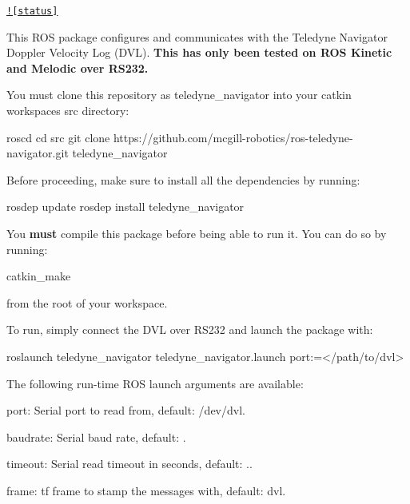 \href{https://dev.mcgillrobotics.com/job/ros-teledyne-navigator/job/master}{\tt !\mbox{[}status\mbox{]}}

This R\+OS package configures and communicates with the Teledyne Navigator Doppler Velocity Log (D\+VL). {\bfseries This has only been tested on R\+OS Kinetic and Melodic over R\+S232.}

You must clone this repository as {\ttfamily teledyne\+\_\+navigator} into your {\ttfamily catkin} workspace\textquotesingle{}s {\ttfamily src} directory\+:


\begin{DoxyCode}
roscd
cd src
git clone https://github.com/mcgill-robotics/ros-teledyne-navigator.git teledyne\_navigator
\end{DoxyCode}


Before proceeding, make sure to install all the dependencies by running\+:


\begin{DoxyCode}
rosdep update
rosdep install teledyne\_navigator
\end{DoxyCode}


You {\bfseries must} compile this package before being able to run it. You can do so by running\+:


\begin{DoxyCode}
catkin\_make
\end{DoxyCode}


from the root of your workspace.

To run, simply connect the D\+VL over R\+S232 and launch the package with\+:


\begin{DoxyCode}
roslaunch teledyne\_navigator teledyne\_navigator.launch port:=</path/to/dvl>
\end{DoxyCode}


The following run-\/time R\+OS launch arguments are available\+:


\begin{DoxyItemize}
\item {\ttfamily port}\+: Serial port to read from, default\+: {\ttfamily /dev/dvl}.
\item {\ttfamily baudrate}\+: Serial baud rate, default\+: {}.
\item {\ttfamily timeout}\+: Serial read timeout in seconds, default\+: {.}.
\item {\ttfamily frame}\+: {\ttfamily tf} frame to stamp the messages with, default\+: {\ttfamily dvl}.
\end{DoxyItemize}

